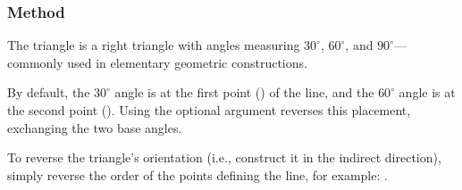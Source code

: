 \vspace{1em}
\begin{minipage}{.5\textwidth}
\begin{center}
\end{center}
\end{minipage}
\begin{minipage}{.5\textwidth}
\begin{tkzexample}
\end{tkzexample}
\end{minipage}

\subsubsection{Method }
\label{ssub:method_imeth_line_school_swap}
The  triangle is a right triangle with angles measuring $30^\circ$, $60^\circ$, and $90^\circ$—commonly used in elementary geometric constructions.

\medskip
\noindent
By default, the $30^\circ$ angle is at the first point () of the line, and the $60^\circ$ angle is at the second point (). Using the optional argument  reverses this placement, exchanging the two base angles.

\medskip
\noindent
To reverse the triangle’s orientation (i.e., construct it in the indirect direction), simply reverse the order of the points defining the line, for example:
.

